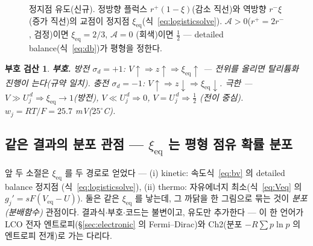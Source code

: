 \documentclass[11pt,a4paper]{article}
\newtheorem*{signbox}{부호 검산}
\newcommand{\eq}{\mathrm{eq}}
\begin{document}
\begin{figure}[t]
\centering
{}
\caption{정지점 유도(신규). 정방향 플럭스 $r^+(1-\xi)$(감소 직선)와 역방향 $r^-\xi$(증가 직선)의 교점이 정지점
$\xi_\eq$(식~\eqref{eq:logisticsolve}). $\mathcal A>0$($r^+=2r^-$, 검정)이면 $\xi_\eq=2/3$, $\mathcal A=0$
(회색)이면 $\tfrac12$ — detailed balance(식~\eqref{eq:db})가 평형을 정한다.}
\label{fig:flux}
\end{figure}

\begin{signbox}
\textbf{부호.} 방전 $\sigma_d=+1$: $V\!\uparrow\Rightarrow z\!\uparrow\Rightarrow\xi_\eq\!\uparrow$ — 전위를 올리면
탈리튬화 진행이 는다(규약 일치). 충전 $\sigma_d=-1$: $V\!\uparrow\Rightarrow z\!\downarrow\Rightarrow\xi_\eq\!\downarrow$.
극한 — $V\gg U_j^{\,d}\Rightarrow\xi_\eq\to1$(방전), $V\ll U_j^{\,d}\Rightarrow0$, $V=U_j^{\,d}\Rightarrow\tfrac12$
(전이 중심). $w_j=RT/F=25.7$ mV($25^\circ$C).
\end{signbox}

\subsection{같은 결과의 분포 관점 — $\xi_\eq$ 는 평형 점유 확률 분포}\label{sec:dist}
앞 두 소절은 $\xi_\eq$ 를 두 경로로 얻었다 — (i) kinetic: 속도식~\eqref{eq:bv} 의 detailed balance 정지점
(식~\eqref{eq:logisticsolve}), (ii) thermo: 자유에너지 최소(식~\eqref{eq:Veq} 의 $g_j'=sF(V_\eq-U)$). 둘은 같은
$\xi_\eq$ 를 낳는데, 그 까닭을 한 그림으로 묶는 것이 \emph{분포(분배함수)} 관점이다. 결과식$\cdot$부호$\cdot$코드는
불변이고, 유도만 추가한다 — 이 한 언어가 LCO 전자 엔트로피(\S\ref{sec:electronic} 의 Fermi--Dirac)와 Ch2(분포
$-R\sum p\ln p$ 의 엔트로피 전개)로 가는 다리다.
\end{document}
